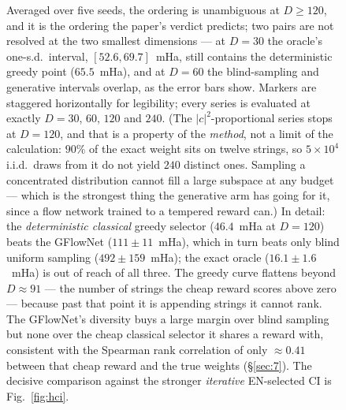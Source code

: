 \documentclass[onecolumn,a4paper]{quantumarticle}
\begin{document}
\begin{figure}[tbp]
{Averaged over five seeds, the ordering is unambiguous at $D\ge120$, and it is the ordering the paper's verdict
predicts; two pairs are not resolved at the two smallest dimensions --- at $D{=}30$ the oracle's one-s.d.\ interval, $[52.6,69.7]$~mHa, still contains the deterministic greedy
point ($65.5$~mHa), and at $D{=}60$ the blind-sampling and generative intervals overlap, as the error bars show.
Markers are staggered horizontally for legibility; every series is evaluated at exactly $D{=}30$,
$60$, $120$ and $240$. (The $|c|^2$-proportional series stops at $D{=}120$, and that is a property of the \emph{method},
not a limit of the calculation: $90\%$ of the exact weight sits on twelve strings, so $5\times10^{4}$ i.i.d.\ draws
from it do not yield $240$ distinct ones. Sampling a concentrated distribution cannot fill a large subspace at
any budget --- which is the strongest thing the generative arm has going for it, since a flow network trained to
a tempered reward can.) In detail: the \emph{deterministic classical} greedy selector ($46.4$~mHa at $D{=}120$)
beats the GFlowNet ($111\pm11$~mHa), which in turn beats only blind uniform sampling ($492\pm159$~mHa); the exact
oracle ($16.1\pm1.6$~mHa) is out of reach of all three. The greedy curve flattens beyond $D{\approx}91$ --- the
number of strings the cheap reward scores above zero --- because past that point it is appending strings it cannot
rank. The GFlowNet's diversity buys a large margin over blind sampling but none over the cheap classical selector
it shares a reward with, consistent with the Spearman rank correlation of only ${\approx}0.41$ between that cheap
reward and the true weights (\S\ref{sec:7}).  The decisive comparison against the stronger \emph{iterative} EN-selected
CI is Fig.~\ref{fig:hci}.}
\label{fig:compact}
\end{figure}
\end{document}
